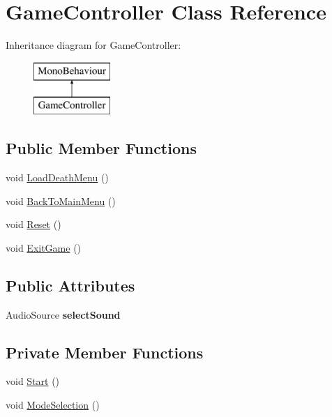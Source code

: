 \hypertarget{class_game_controller}{}\section{Game\+Controller Class Reference}
\label{class_game_controller}
Inheritance diagram for Game\+Controller\+:\begin{figure}[H]
\begin{center}
\leavevmode
\includegraphics[height=2.000000cm]{class_game_controller}
\end{center}
\end{figure}
\subsection*{Public Member Functions}
\begin{DoxyCompactItemize}
\item 
void \mbox{\hyperlink{class_game_controller_ad6e73ede9ce6222e8cfd5369ef87b04e}{Load\+Death\+Menu}} ()
\item 
void \mbox{\hyperlink{class_game_controller_a58d386f77a7fc928a560963e2beec59e}{Back\+To\+Main\+Menu}} ()
\item 
void \mbox{\hyperlink{class_game_controller_a3cd671c32f42d6d53b040a73af63aeda}{Reset}} ()
\item 
void \mbox{\hyperlink{class_game_controller_ac89db365db6f9a2dde8d6bb346d39d3b}{Exit\+Game}} ()
\end{DoxyCompactItemize}
\subsection*{Public Attributes}
\begin{DoxyCompactItemize}
\item 
\mbox{\label{class_game_controller_a07fd6c756caa5f300f3c0e6bfd803d37}} 
Audio\+Source {\bfseries select\+Sound}
\end{DoxyCompactItemize}
\subsection*{Private Member Functions}
\begin{DoxyCompactItemize}
\item 
void \mbox{\hyperlink{class_game_controller_a97788a7aa0f09c8d748781683e5f045b}{Start}} ()
\item 
void \mbox{\hyperlink{class_game_controller_a99b8c25fe75a7f72c919b6670122c342}{Mode\+Selection}} ()
\end{DoxyCompactItemize}
